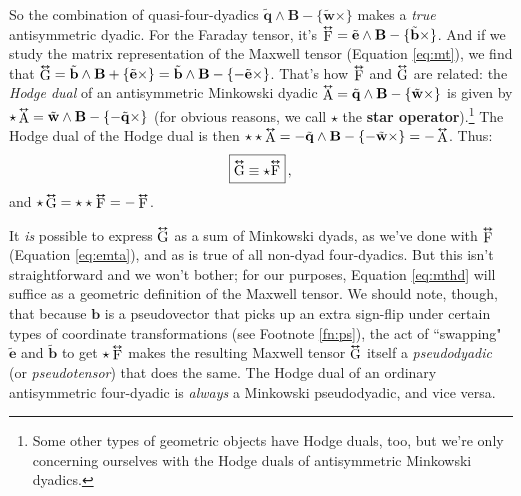 \documentclass[12pt]{article}
\renewcommand{\vv}[1]{\mathbf{#1}}
\newcommand{\tightoverset}[2]{%
  \mathop{#2}\limits^{\vbox to -.5ex{\kern-0.75ex\hbox{$#1$}\vss}}}
\newcommand{\inlinedy}[1]{\tightoverset{\text{\tiny$\bm\leftrightarrow$}}{#1}}
\newcommand{\capdy}[1]{ \overset{ \text{\tiny$\bm\leftrightarrow$} }{\vphantom{\text{\small{A}}}\smash{#1}} }
\begin{document}
So the combination of quasi-four-dyadics $\tilde{\vv q} \wedge \vv B - \{ \tilde{\vv w} \times \}$ makes a \emph{true} antisymmetric dyadic. For the Faraday tensor, it's $\inlinedy{\mathrm{F}} = \tilde{\vv e} \wedge \vv B - \{ \tilde{\vv b} \times \}$. And if we study the matrix representation of the Maxwell tensor (Equation \ref{eq:mt}), we find that $\inlinedy{\mathrm{G}} = \tilde{\vv b} \wedge \vv B + \{ \tilde{\vv e} \times \} = \tilde{\vv b} \wedge \vv B - \{ - \tilde{\vv e} \times \}$. That's how $\inlinedy{\mathrm{F}}$ and $\inlinedy{\mathrm{G}}$ are related: the \emph{Hodge dual} of an antisymmetric Minkowski dyadic $\inlinedy{\mathrm{A}} = \tilde{\vv q} \wedge \vv B - \{ \tilde{\vv w} \times \}$ is given by $\star \inlinedy{\mathrm{A}} = \tilde{\vv w} \wedge \vv B - \{ - \tilde{\vv q} \times \}$ (for obvious reasons, we call $\star$ the \textbf{star operator}).\footnote{Some other types of geometric objects have Hodge duals, too, but we're only concerning ourselves with the Hodge duals of antisymmetric Minkowski dyadics.} The Hodge dual of the Hodge dual is then $\star \star \inlinedy{\mathrm{A}} = - \tilde{\vv q} \wedge \vv B - \{ - \tilde{\vv w} \times \} = - \inlinedy{\mathrm{A}}$. Thus:
\begin{equation}\label{eq:mthd}
\boxed{ \vphantom{A_{A_A}} \capdy{\mathrm{G}} \equiv \star \capdy{\mathrm{F}} } \, ,
\end{equation}
and $\star \inlinedy{\mathrm{G}} = \star \star \inlinedy{\mathrm{F}} = - \inlinedy{\mathrm{F}}$.

It \emph{is} possible to express $\inlinedy{\mathrm{G}}$ as a sum of Minkowski dyads, as we've done with $\inlinedy{\mathrm{F}}$ (Equation \ref{eq:emta}), and as is true of all non-dyad four-dyadics. But this isn't straightforward and we won't bother; for our purposes, Equation \ref{eq:mthd} will suffice as a geometric definition of the Maxwell tensor. We should note, though, that because $\vv b$ is a pseudovector that picks up an extra sign-flip under certain types of coordinate transformations (see Footnote \ref{fn:ps}), the act of ``swapping" $\tilde{\vv e}$ and $\tilde{\vv b}$ to get $\star \inlinedy{\mathrm{F}}$ makes the resulting Maxwell tensor $\inlinedy{\mathrm{G}}$ itself a \emph{pseudodyadic} (or \emph{pseudotensor}) that does the same. The Hodge dual of an ordinary antisymmetric four-dyadic is \emph{always} a Minkowski pseudodyadic, and vice versa.
\end{document}
